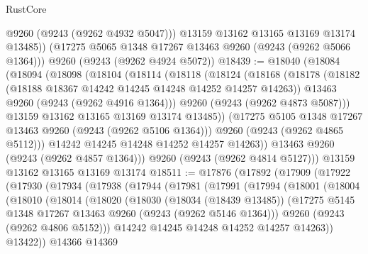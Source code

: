 \begin{lexlean}{RustCore}
\begin{coremodule}
          @9260
          (@9243 (@9262 @4932 @5047)))
        @13159
        @13162
        @13165
        @13169
        @13174
        @13485))
    (@17275 @5065 @1348 @17267 @13463 @9260 (@9243 (@9262 @5066 @1364)))
    @9260
    (@9243 (@9262 @4924 @5072))
@18439 := @18040
    (@18084
      (@18094
        (@18098
          (@18104
            (@18114
              (@18118
                (@18124
                  (@18168
                    (@18178
                      (@18182 (@18188 @18367 @14242 @14245 @14248 @14252 @14257 @14263))
                      @13463
                      @9260
                      (@9243 (@9262 @4916 @1364)))
                    @9260
                    (@9243 (@9262 @4873 @5087)))
                  @13159
                  @13162
                  @13165
                  @13169
                  @13174
                  @13485))
              (@17275 @5105 @1348 @17267 @13463 @9260 (@9243 (@9262 @5106 @1364)))
              @9260
              (@9243 (@9262 @4865 @5112)))
            @14242
            @14245
            @14248
            @14252
            @14257
            @14263))
        @13463
        @9260
        (@9243 (@9262 @4857 @1364)))
      @9260
      (@9243 (@9262 @4814 @5127)))
    @13159
    @13162
    @13165
    @13169
    @13174
@18511 := @17876
    (@17892
      (@17909
        (@17922
          (@17930
            (@17934
              (@17938
                (@17944
                  (@17981
                    (@17991
                      (@17994
                        (@18001
                          (@18004
                            (@18010
                              (@18014
                                (@18020
                                  (@18030
                                    (@18034 (@18439 @13485))
                                    (@17275
                                      @5145
                                      @1348
                                      @17267
                                      @13463
                                      @9260
                                      (@9243 (@9262 @5146 @1364)))
                                    @9260
                                    (@9243 (@9262 @4806 @5152)))
                                  @14242
                                  @14245
                                  @14248
                                  @14252
                                  @14257
                                  @14263))
                              @13422))
                          @14366
                          @14369

\end{coremodule}
\end{lexlean}
